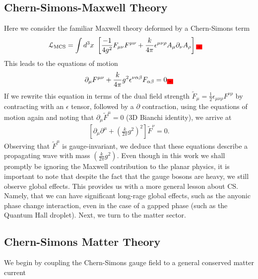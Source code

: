     \subsection{Chern-Simons-Maxwell Theory}
    Here we consider the familiar Maxwell theory deformed by a Chern-Simons term\colorbox{red}{ }
    \begin{align}
        \mathcal{L}_{\text{MCS}} &= \int d^3x \ \left[ \frac{-1}{4 g^2} F_{\mu \nu} F^{\mu \nu} + \frac{k}{4 \pi} \epsilon^{\mu \nu \rho} A_{\mu} \partial_{\nu} A_{\rho} \right]\colorbox{red}{.}
    \end{align}
    This leads to the equations of motion
    \begin{align}
        \partial_{\mu} F^{\mu \nu} + \frac{k}{4\pi} g^2 \epsilon^{\nu \alpha \beta}F_{\alpha \beta} =0\colorbox{red}{.}
    \end{align}
    If we rewrite this equation in terms of the dual field strength $\tilde{F}_{\mu} = \frac{1}{2} \epsilon_{\mu\nu\rho} F^{\nu\rho}$ by contracting with an $\epsilon$ tensor, followed by a $\partial$ contraction, using the equations of motion again and noting that $\partial_{\mu} \tilde{F}^{\mu} =0$ (3D Bianchi identity), we arrive at 
    \begin{align}
        \left[\partial_{\mu} \partial^{\mu} + \left(\frac{k}{2 \pi} g^2 \right)^2 \right] \tilde{F}^{\nu}=0.
    \end{align}
    Observing that $\tilde{F}^{\mu}$ is gauge-invariant, we deduce that these equations describe a propagating wave with mass $\left(\frac{k}{2 \pi} g^2 \right)$.
    Even though in this work we shall promptly be ignoring the Maxwell contribution to the planar physics, it is important to note that despite the fact that the gauge bosons are heavy, we still observe global effects. This provides us with a more general lesson about CS. Namely, that we can have significant long-rage global effects, such as the anyonic phase change interaction, even in the case of a gapped phase (such as the Quantum Hall droplet).
    Next, we turn to the matter sector.
    \subsection{Chern-Simons Matter Theory}
    
    We begin by coupling the Chern-Simons gauge field to a general conserved matter current\colorbox{red}{ }



